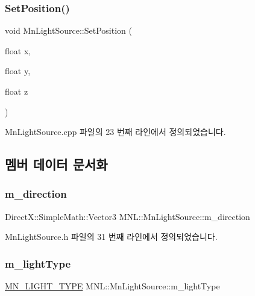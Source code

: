 \subsubsection{\texorpdfstring{Set\+Position()}{SetPosition()}\hspace{0.1cm}{\footnotesize\ttfamily [2/2]}}
{\footnotesize\ttfamily void Mn\+Light\+Source\+::\+Set\+Position (\begin{DoxyParamCaption}\item[{float}]{x,  }\item[{float}]{y,  }\item[{float}]{z }\end{DoxyParamCaption})}



Mn\+Light\+Source.\+cpp 파일의 23 번째 라인에서 정의되었습니다.



\subsection{멤버 데이터 문서화}
\mbox{\label{class_m_n_l_1_1_mn_light_source_aaafaae41b829081e37446b58c923e8bf}} 
\subsubsection{\texorpdfstring{m\+\_\+direction}{m\_direction}}
{\footnotesize\ttfamily Direct\+X\+::\+Simple\+Math\+::\+Vector3 M\+N\+L\+::\+Mn\+Light\+Source\+::m\+\_\+direction\hspace{0.3cm}{\ttfamily [private]}}



Mn\+Light\+Source.\+h 파일의 31 번째 라인에서 정의되었습니다.

\mbox{\label{class_m_n_l_1_1_mn_light_source_a5d016d5d35ebaef363819340444b41a3}} 
\subsubsection{\texorpdfstring{m\+\_\+light\+Type}{m\_lightType}}
{\footnotesize\ttfamily \hyperlink{namespace_m_n_l_aac0b78de8bb8c872cb617ede813c113d}{M\+N\+\_\+\+L\+I\+G\+H\+T\+\_\+\+T\+Y\+PE} M\+N\+L\+::\+Mn\+Light\+Source\+::m\+\_\+light\+Type\hspace{0.3cm}{\ttfamily [private]}}



